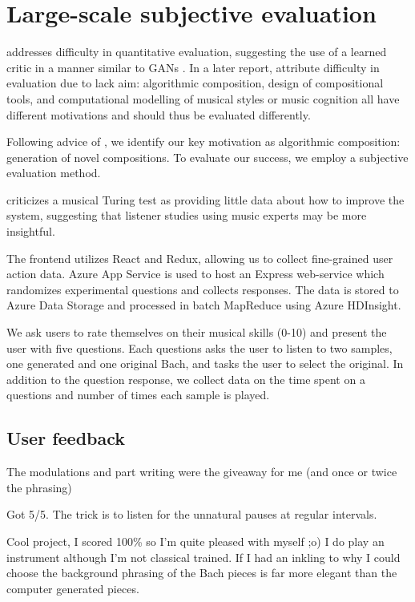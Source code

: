 \documentclass[dissertation.tex]{subfiles}
\begin{document}
\chapter{Large-scale subjective evaluation}

\cite{pearce2001towards} addresses difficulty in quantitative evaluation,
suggesting the use of a learned critic in a manner similar to GANs
\cite{goodfellow2014generative}. In a later report,
\cite{pearce2002motivations} attribute difficulty in evaluation due to lack
aim: algorithmic composition, design of compositional tools, and computational
modelling of musical styles or music cognition all have different motivations
and should thus be evaluated differently.

Following advice of \cite{pearce2002motivations}, we identify our key
motivation as algorithmic composition: generation of novel compositions.
To evaluate our success, we employ a subjective evaluation method.

\cite{ariza2009} criticizes a musical Turing test as providing little data about
how to improve the system, suggesting that listener studies using music experts
may be more insightful.



The frontend utilizes React and Redux, allowing us to collect fine-grained user
action data. Azure App Service is used to host an Express web-service which
randomizes experimental questions and collects responses. The data is stored to
Azure Data Storage and processed in batch MapReduce using Azure HDInsight.

We ask users to rate themselves on their musical skills (0-10) and present the
user with five questions. Each questions asks the user to listen to two
samples, one generated and one original Bach, and tasks the user to select the
original. In addition to the question response, we collect data on the time
spent on a questions and number of times each sample is played.

\section{User feedback}

The modulations and part writing were the giveaway for me (and once or twice the phrasing)

Got 5/5. The trick is to listen for the unnatural pauses at regular intervals.

Cool project, I scored 100\% so I'm quite pleased with myself ;o) I do
play an instrument although I'm not classical trained. If I had an
inkling to why I could choose the background phrasing of the Bach
pieces is far more elegant than the computer generated pieces.

\printbibliography
\end{document}
